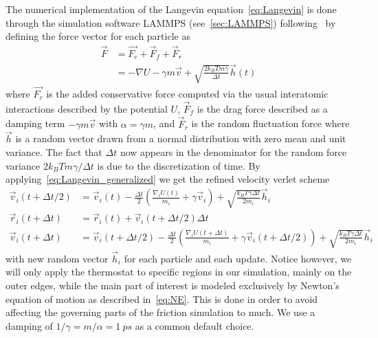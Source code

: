 The numerical implementation of the Langevin equation~\cref{eq:Langevin} is done through the simulation software LAMMPS (see~\cref{sec:LAMMPS}) following~\cite{PhysRevB.17.1302} by defining the force vector for each particle as 
\begin{align}
  \vec{F} &= \vec{F_c} + \vec{F}_{f} + \vec{F}_{r} \nonumber \\
  &= -\nabla U - \gamma m \vec{v} + \sqrt{\frac{2 k_B T m \gamma}{\Delta t}}\vec{h}(t)
  \label{eq:Langevin_generalized}
\end{align}
where $\vec{F_c}$ is the added conservative force computed via the usual
interatomic interactions described by the potential $U$, $\vec{F}_f$ is the
drag force described as a damping term $-\gamma m \vec{v}$ with $\alpha = \gamma m$, and $\vec{F}_r$ is the random fluctuation force where $\vec{h}$ is a random vector drawn from a normal distribution with zero mean and unit variance. The fact that $\Delta t$ now appears in the denominator for the random force variance $2k_B T m \gamma / \Delta t$ is due to the discretization of time. By applying~\cref{eq:Langevin_generalized} we get the refined velocity verlet scheme
\begin{align*}
  \vec{v}_i(t + \Delta t/2)  &= \vec{v}_i(t) - \frac{\Delta t}{2}\left(\frac{\nabla_i U(t)}{m_i} + \gamma \vec{v}_i \right) + \sqrt{\frac{k_B T \gamma \Delta t}{2m_i}} \vec{h}_i \\ 
  \vec{r}_i(t + \Delta t) &= \vec{r}_i(t) + \vec{v}_i(t + \Delta t/2) \Delta t \\
  \vec{v}_i(t + \Delta t) &= \vec{v}_i(t+ \Delta t/2) - \frac{\Delta t}{2}\left(\frac{\nabla_i U(t + \Delta t)}{m_i} + \gamma \vec{v}_i(t + \Delta t/2) \right) + \sqrt{\frac{k_B T \gamma \Delta t}{2m_i}} \vec{h}_i
\end{align*}
with new random vector $\vec{h}_i$ for each particle and each update. Notice
however, we will only apply the thermostat to specific regions in our simulation, mainly on the outer edges, while the main part of interest is modeled exclusively by Newton's equation of motion as described in~\cref{eq:NE}. This is done in order to avoid affecting the governing parts of the friction simulation to much. We use a damping of $1/\gamma = m/\alpha = \SI{1}{ps}$ as a common default choice. 




